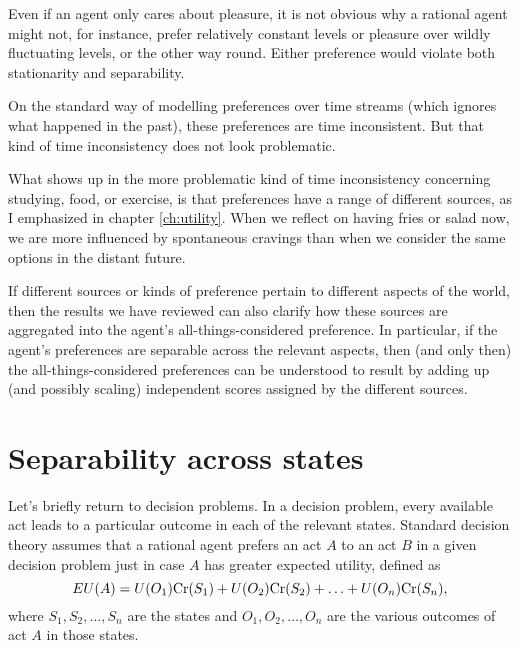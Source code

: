 Even if an agent only cares about pleasure, it is not obvious why a
rational agent might not, for instance, prefer relatively constant
levels or pleasure over wildly fluctuating levels, or the other way
round. Either preference would violate both stationarity and
separability.


On the standard way of modelling preferences over time streams (which
ignores what happened in the past), these preferences are time
inconsistent. But that kind of time inconsistency does not look
problematic.

What shows up in the more problematic kind of time inconsistency
concerning studying, food, or exercise, is that preferences have a
range of different sources, as I emphasized in chapter
\ref{ch:utility}. When we reflect on having fries or salad now, we are
more influenced by spontaneous cravings than when we consider the same
options in the distant future.

If different sources or kinds of preference pertain to different
aspects of the world, then the results we have reviewed can also clarify
how these sources are aggregated into the agent's
all-things-considered preference. In particular, if the agent's
preferences are separable across the relevant aspects, then (and only
then) the all-things-considered preferences can be understood to
result by adding up (and possibly scaling) independent scores assigned
by the different sources.

%

\section{Separability across states}

Let's briefly return to decision problems. In a decision problem,
every available act leads to a particular outcome in each of the
relevant states. Standard decision theory assumes that a rational
agent prefers an act $A$ to an act $B$ in a given decision problem
just in case $A$ has greater expected utility, defined as
\[
EU(A) = U(O_1)\text{Cr}(S_1) + U(O_2)\text{Cr}(S_2) + \ldots + U(O_n)\text{Cr}(S_n),
\]
where $S_1,S_2,\ldots,S_n$ are the states and $O_1,O_2,\ldots,O_n$ are
the various outcomes of act $A$ in those states.

